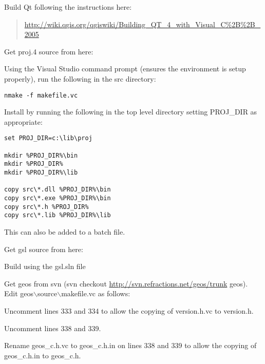 \hypertarget{toc82}{}
Build Qt following the instructions here:

	\begin{quotation}
\url{http://wiki.qgis.org/qgiswiki/Building\_QT\_4\_with\_Visual\_C\%2B\%2B\_2005}
	\end{quotation}

\hypertarget{toc83}{}
Get proj.4 source from here:

	\begin{quotation}
	\end{quotation}
Using the Visual Studio command prompt (ensures the environment is setup properly), run the following in the src directory:

\begin{verbatim}
nmake -f makefile.vc
\end{verbatim}

Install by running the following in the top level directory setting PROJ\_DIR as appropriate:

\begin{verbatim}
set PROJ_DIR=c:\lib\proj

mkdir %PROJ_DIR%\bin
mkdir %PROJ_DIR%
mkdir %PROJ_DIR%\lib

copy src\*.dll %PROJ_DIR%\bin
copy src\*.exe %PROJ_DIR%\bin
copy src\*.h %PROJ_DIR%
copy src\*.lib %PROJ_DIR%\lib 
\end{verbatim}

This can also be added to a batch file.

\hypertarget{toc84}{}
Get gsl source from here:

	\begin{quotation}
	\end{quotation}
Build using the gsl.sln file

\hypertarget{toc85}{}
Get geos from svn (svn checkout \url{http://svn.refractions.net/geos/trunk} geos).
Edit geos$\backslash$source$\backslash$makefile.vc as follows:

Uncomment lines 333 and 334 to allow the copying of version.h.vc to version.h.

Uncomment lines 338 and 339.

Rename geos\_c.h.vc to geos\_c.h.in on lines 338 and 339 to allow the copying of geos\_c.h.in to geos\_c.h.

